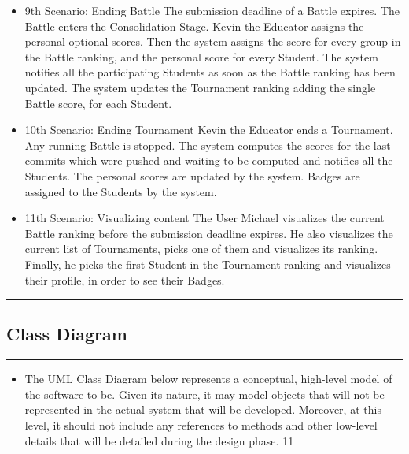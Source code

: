\documentclass{Configuration_Files/Template}
\begin{document}
\begin{itemize}
\item \textcolor{bluepoli}{9th Scenario: Ending Battle} The submission deadline of a Battle expires. The Battle enters the Consolidation Stage. Kevin the Educator assigns the personal optional scores. Then the system assigns the score for every group in the Battle ranking, and the personal score for every Student. The system notifies all the participating Students as soon as the Battle ranking has been updated. The system updates the Tournament ranking adding the single Battle score, for each Student.
\item \textcolor{bluepoli}{10th Scenario: Ending Tournament} Kevin the Educator ends a Tournament. Any running Battle is stopped. The system computes the scores for the last commits which were pushed and waiting to be computed and notifies all the Students. The personal scores are updated by the system. Badges are assigned to the Students by the system.
\item \textcolor{bluepoli}{11th Scenario: Visualizing content} The User Michael visualizes the current Battle ranking before the submission deadline expires. He also visualizes the current list of Tournaments, picks one of them and visualizes its ranking. Finally, he picks the first Student in the Tournament ranking and visualizes their profile, in order to see their Badges.
\end{itemize}

{\color{bluepoli}\rule{\linewidth}{0.1pt}}

\subsection{Class Diagram}

{\color{bluepoli}\rule{\linewidth}{0.1pt}}

\begin{itemize}
\item The UML Class Diagram below represents a conceptual, high-level model of the software to be. Given its nature, it may model objects that will not be represented in the actual system that will be 
developed. Moreover, at this level, it should not include any references to methods and other low-level details that will be detailed during the design phase. 11
\end{itemize}
\end{document}

